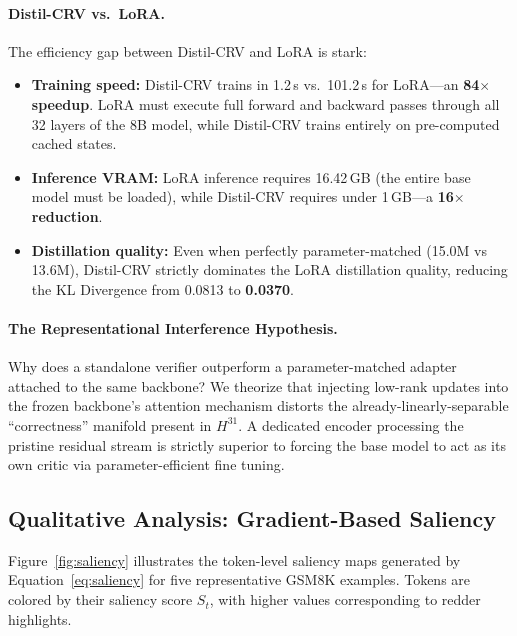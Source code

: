 \documentclass{article}
\begin{document}
\paragraph{Distil-CRV vs.\ LoRA.} The efficiency gap between Distil-CRV and LoRA is stark:
\begin{itemize}[topsep=2pt, itemsep=1pt]
  \item \textbf{Training speed:} Distil-CRV trains in 1.2\,s vs.\ 101.2\,s for LoRA---an \textbf{84$\times$ speedup}. LoRA must execute full forward and backward passes through all 32 layers of the 8B model, while Distil-CRV trains entirely on pre-computed cached states.
  \item \textbf{Inference VRAM:} LoRA inference requires 16.42\,GB (the entire base model must be loaded), while Distil-CRV requires under 1\,GB---a \textbf{16$\times$ reduction}.
  \item \textbf{Distillation quality:} Even when perfectly parameter-matched (15.0M vs 13.6M), Distil-CRV strictly dominates the LoRA distillation quality, reducing the KL Divergence from 0.0813 to \textbf{0.0370}.
\end{itemize}

\paragraph{The Representational Interference Hypothesis.} Why does a standalone verifier outperform a parameter-matched adapter attached to the same backbone? We theorize that injecting low-rank updates into the frozen backbone's attention mechanism distorts the already-linearly-separable ``correctness'' manifold present in $H^{31}$. A dedicated encoder processing the pristine residual stream is strictly superior to forcing the base model to act as its own critic via parameter-efficient fine tuning.

\subsection{Qualitative Analysis: Gradient-Based Saliency}
\label{sec:saliency_results}

Figure~\ref{fig:saliency} illustrates the token-level saliency maps generated by Equation~\eqref{eq:saliency} for five representative GSM8K examples. Tokens are colored by their saliency score $S_t$, with higher values corresponding to redder highlights.
\end{document}
